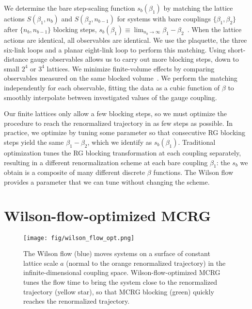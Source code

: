 \documentclass{PoS}
\newcommand{\be}{\ensuremath{\beta} }
\begin{document}
We determine the bare step-scaling function $s_b(\be_1)$ by matching the lattice actions $S(\be_1, n_b)$ and $S(\be_2, n_{b - 1})$ for systems with bare couplings $\{\be_1, \be_2\}$ after $\{n_b, n_{b - 1}\}$ blocking steps, $s_b(\be_1) \equiv \lim_{n_b \to \infty} \be_1 - \be_2$~\cite{Petropoulos:2012mg}.
When the lattice actions are identical, all observables are identical.
We use the plaquette, the three six-link loops and a planar eight-link loop to perform this matching.
Using short-distance gauge observables allows us to carry out more blocking steps, down to small $2^4$ or $3^4$ lattices.
We minimize finite-volume effects by comparing observables measured on the same blocked volume~\cite{Hasenfratz:2011xn}.
We perform the matching independently for each observable, fitting the data as a cubic function of \be to smoothly interpolate between investigated values of the gauge coupling.

Our finite lattices only allow a few blocking steps, so we must optimize the procedure to reach the renormalized trajectory in as few steps as possible.
In practice, we optimize by tuning some parameter so that consecutive RG blocking steps yield the same $\be_1 - \be_2$, which we identify as $s_b(\be_1)$.
Traditional optimization tunes the RG blocking transformation at each coupling separately, resulting in a different renormalization scheme at each bare coupling $\be_1$: the $s_b$ we obtain is a composite of many different discrete \be functions.
The Wilson flow provides a parameter that we can tune without changing the scheme.



\section{\label{sec:wmcrg}Wilson-flow-optimized MCRG} %
\begin{figure}[th]
  \centering
  \texttt{[image: fig/wilson\_flow\_opt.png]}
  \caption{The Wilson flow (blue) moves systems on a surface of constant lattice scale $a$ (normal to the orange renormalized trajectory) in the infinite-dimensional coupling space.  Wilson-flow-optimized MCRG tunes the flow time to bring the system close to the renormalized trajectory (yellow star), so that MCRG blocking (green) quickly reaches the renormalized trajectory.}
  \label{fig:wflow_opt}
\end{figure}
\end{document}
